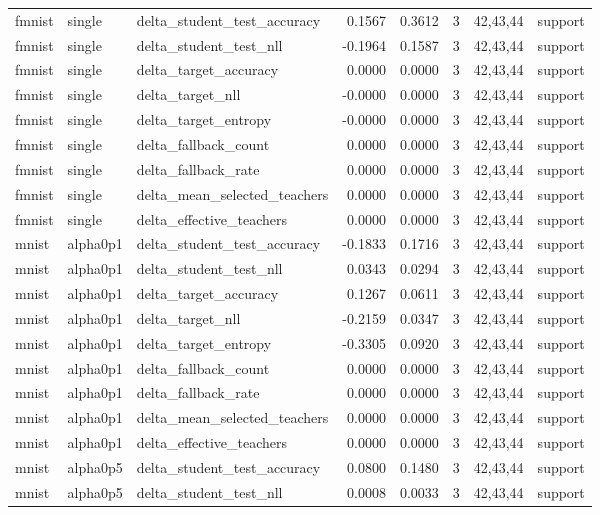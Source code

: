 \begin{tabular}{lllrrrll}
fmnist & single & delta\_student\_test\_accuracy & 0.1567 & 0.3612 & 3 & 42,43,44 & support \\
fmnist & single & delta\_student\_test\_nll & -0.1964 & 0.1587 & 3 & 42,43,44 & support \\
fmnist & single & delta\_target\_accuracy & 0.0000 & 0.0000 & 3 & 42,43,44 & support \\
fmnist & single & delta\_target\_nll & -0.0000 & 0.0000 & 3 & 42,43,44 & support \\
fmnist & single & delta\_target\_entropy & -0.0000 & 0.0000 & 3 & 42,43,44 & support \\
fmnist & single & delta\_fallback\_count & 0.0000 & 0.0000 & 3 & 42,43,44 & support \\
fmnist & single & delta\_fallback\_rate & 0.0000 & 0.0000 & 3 & 42,43,44 & support \\
fmnist & single & delta\_mean\_selected\_teachers & 0.0000 & 0.0000 & 3 & 42,43,44 & support \\
fmnist & single & delta\_effective\_teachers & 0.0000 & 0.0000 & 3 & 42,43,44 & support \\
mnist & alpha0p1 & delta\_student\_test\_accuracy & -0.1833 & 0.1716 & 3 & 42,43,44 & support \\
mnist & alpha0p1 & delta\_student\_test\_nll & 0.0343 & 0.0294 & 3 & 42,43,44 & support \\
mnist & alpha0p1 & delta\_target\_accuracy & 0.1267 & 0.0611 & 3 & 42,43,44 & support \\
mnist & alpha0p1 & delta\_target\_nll & -0.2159 & 0.0347 & 3 & 42,43,44 & support \\
mnist & alpha0p1 & delta\_target\_entropy & -0.3305 & 0.0920 & 3 & 42,43,44 & support \\
mnist & alpha0p1 & delta\_fallback\_count & 0.0000 & 0.0000 & 3 & 42,43,44 & support \\
mnist & alpha0p1 & delta\_fallback\_rate & 0.0000 & 0.0000 & 3 & 42,43,44 & support \\
mnist & alpha0p1 & delta\_mean\_selected\_teachers & 0.0000 & 0.0000 & 3 & 42,43,44 & support \\
mnist & alpha0p1 & delta\_effective\_teachers & 0.0000 & 0.0000 & 3 & 42,43,44 & support \\
mnist & alpha0p5 & delta\_student\_test\_accuracy & 0.0800 & 0.1480 & 3 & 42,43,44 & support \\
mnist & alpha0p5 & delta\_student\_test\_nll & 0.0008 & 0.0033 & 3 & 42,43,44 & support \\

\end{tabular}
